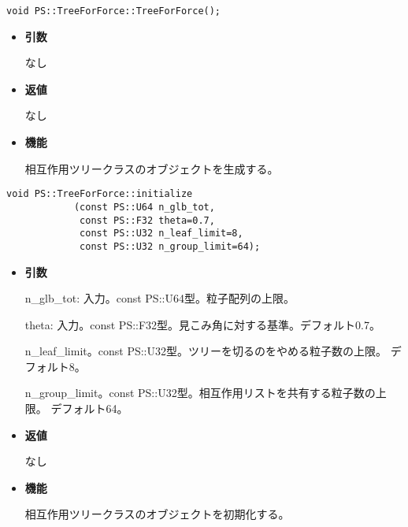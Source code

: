 \begin{screen}
\begin{verbatim}
void PS::TreeForForce::TreeForForce();
\end{verbatim}
\end{screen}

\begin{itemize}

\item {\bf 引数}

なし

\item {\bf 返値}

なし

\item {\bf 機能}

相互作用ツリークラスのオブジェクトを生成する。

\end{itemize}


\begin{screen}
\begin{verbatim}
void PS::TreeForForce::initialize
            (const PS::U64 n_glb_tot,
             const PS::F32 theta=0.7,
             const PS::U32 n_leaf_limit=8,
             const PS::U32 n_group_limit=64);
\end{verbatim}
\end{screen}

\begin{itemize}

\item {\bf 引数}

n\_glb\_tot: 入力。const PS::U64型。粒子配列の上限。

theta: 入力。const PS::F32型。見こみ角に対する基準。デフォルト0.7。

n\_leaf\_limit。const PS::U32型。ツリーを切るのをやめる粒子数の上限。
デフォルト8。

n\_group\_limit。const PS::U32型。相互作用リストを共有する粒子数の上限。
デフォルト64。

\item {\bf 返値}

なし

\item {\bf 機能}

相互作用ツリークラスのオブジェクトを初期化する。

\end{itemize}




